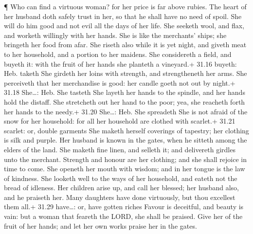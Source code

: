  ¶ Who can find a virtuous woman? for her price is far
above rubies.  The heart of her husband doth safely trust
in her, so that he shall have no need of spoil.  She will
do him good and not evil all the days of her life.  She
seeketh wool, and flax, and worketh willingly with her hands.
 She is like the merchants' ships; she bringeth her food
from afar.  She riseth also while it is yet night, and
giveth meat to her household, and a portion to her maidens.
 She considereth a field, and buyeth it: with the fruit of
her hands she planteth a vineyard.+ 31.16 buyeth: Heb. taketh
 She girdeth her loins with strength, and strengtheneth her
arms.  She perceiveth that her merchandise is good: her
candle goeth not out by night.+ 31.18 She\ldots: Heb. She tasteth
 She layeth her hands to the spindle, and her hands hold
the distaff.  She stretcheth out her hand to the poor; yea,
she reacheth forth her hands to the needy.+ 31.20 She\ldots: Heb. She
spreadeth  She is not afraid of the snow for her household:
for all her household are clothed with scarlet.+ 31.21 scarlet: or,
double garments  She maketh herself coverings of tapestry;
her clothing is silk and purple.  Her husband is known in
the gates, when he sitteth among the elders of the land. 
She maketh fine linen, and selleth it; and delivereth girdles unto the
merchant.  Strength and honour are her clothing; and she
shall rejoice in time to come.  She openeth her mouth with
wisdom; and in her tongue is the law of kindness.  She
looketh well to the ways of her household, and eateth not the bread of
idleness.  Her children arise up, and call her blessed; her
husband also, and he praiseth her.  Many daughters have
done virtuously, but thou excellest them all.+ 31.29 have\ldots: or,
have gotten riches  Favour is deceitful, and beauty is
vain: but a woman that feareth the LORD, she shall be praised.
 Give her of the fruit of her hands; and let her own works
praise her in the gates.
